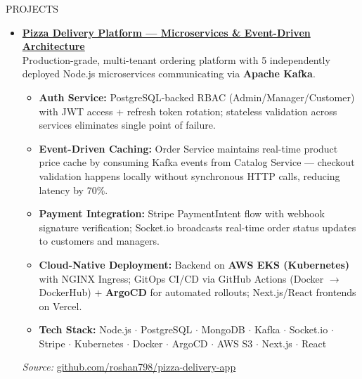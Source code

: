 \documentclass{resume} %
\begin{document}
\begin{rSection}{PROJECTS}
    \vspace{-0.3em}
    \begin{itemize}

        \item \href{https://github.com/roshan798/pizza-delivery-app}{\textbf{Pizza Delivery Platform --- Microservices \& Event-Driven Architecture}}\\
              Production-grade, multi-tenant ordering platform with 5 independently deployed Node.js microservices communicating via \textbf{Apache Kafka}.
              \begin{itemize}
                  \itemsep -3pt
                  \item \textbf{Auth Service:} PostgreSQL-backed RBAC (Admin/Manager/Customer) with JWT access + refresh token rotation; stateless validation across services eliminates single point of failure.
                  \item \textbf{Event-Driven Caching:} Order Service maintains real-time product price cache by consuming Kafka events from Catalog Service --- checkout validation happens locally without synchronous HTTP calls, reducing latency by 70\%.
                  \item \textbf{Payment Integration:} Stripe PaymentIntent flow with webhook signature verification; Socket.io broadcasts real-time order status updates to customers and managers.
                  \item \textbf{Cloud-Native Deployment:} Backend on \textbf{AWS EKS (Kubernetes)} with NGINX Ingress; GitOps CI/CD via GitHub Actions (Docker $\to$ DockerHub) + \textbf{ArgoCD} for automated rollouts; Next.js/React frontends on Vercel.
                  \item \textbf{Tech Stack:} Node.js $\cdot$ PostgreSQL $\cdot$ MongoDB $\cdot$ Kafka $\cdot$ Socket.io $\cdot$ Stripe $\cdot$ Kubernetes $\cdot$ Docker $\cdot$ ArgoCD $\cdot$ AWS S3 $\cdot$ Next.js $\cdot$ React
              \end{itemize}
              \textit{Source:} \href{https://github.com/roshan798/pizza-delivery-app}{github.com/roshan798/pizza-delivery-app}


\end{itemize}
\end{rSection}
\end{document}
